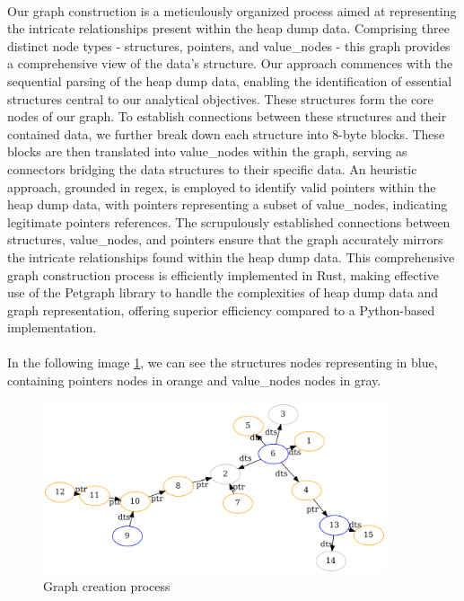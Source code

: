         \paragraph{}Our graph construction is a meticulously organized process aimed at representing the intricate relationships present within the heap dump data. Comprising three distinct node types - \glspl{structure}, \glspl{pointer}, and \glspl{value_node} - this graph provides a comprehensive view of the data's structure. Our approach commences with the sequential parsing of the heap dump data, enabling the identification of essential \glspl{structure} central to our analytical objectives. These \glspl{structure} form the core nodes of our graph. To establish connections between these \glspl{structure} and their contained data, we further break down each structure into 8-byte blocks. These blocks are then translated into \glspl{value_node} within the graph, serving as connectors bridging the data structures to their specific data. An heuristic approach, grounded in \acrshort{regex}, is employed to identify valid \glspl{pointer} within the heap dump data, with \glspl{pointer} representing a subset of \glspl{value_node}, indicating legitimate \glspl{pointer} references. The scrupulously established connections between \glspl{structure}, \glspl{value_node}, and \glspl{pointer} ensure that the graph accurately mirrors the intricate relationships found within the heap dump data. This comprehensive graph construction process is efficiently implemented in Rust, making effective use of the Petgraph library to handle the complexities of heap dump data and graph representation, offering superior efficiency compared to a Python-based implementation.

        \paragraph{}In the following image \ref{fig:graph_embedding:graph_creation_process}, we can see the \glspl{structure} nodes representing in blue, containing \glspl{pointer} nodes in orange and \glspl{value_node} nodes in gray. 

        \begin{figure}[H]
            \centering
            \includegraphics[width=0.9\textwidth]{img/graph_embeding/graph_explain.png}
            \caption{Graph creation process}
            \label{fig:graph_embedding:graph_creation_process}
        \end{figure}

